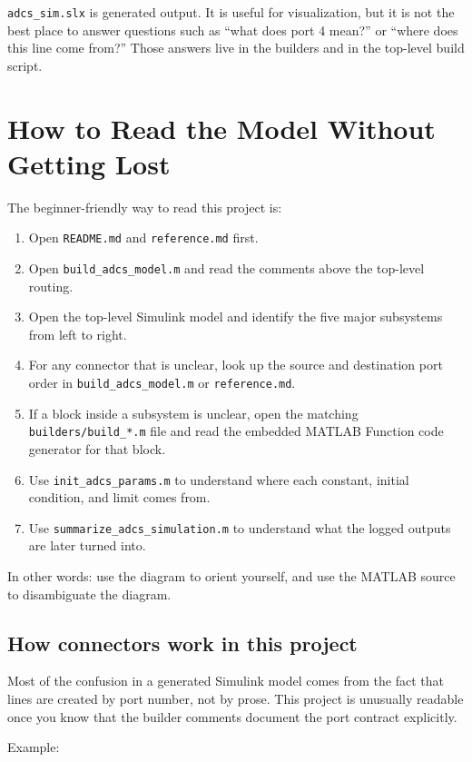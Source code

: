 \documentclass[11pt]{article}
\begin{document}
\texttt{adcs\_sim.slx} is generated output. It is useful for visualization, but it is not the best place to answer questions such as ``what does port 4 mean?'' or ``where does this line come from?'' Those answers live in the builders and in the top-level build script.

\section{How to Read the Model Without Getting Lost}

The beginner-friendly way to read this project is:

\begin{enumerate}
\item Open \texttt{README.md} and \texttt{reference.md} first.
\item Open \texttt{build\_adcs\_model.m} and read the comments above the top-level routing.
\item Open the top-level Simulink model and identify the five major subsystems from left to right.
\item For any connector that is unclear, look up the source and destination port order in \texttt{build\_adcs\_model.m} or \texttt{reference.md}.
\item If a block inside a subsystem is unclear, open the matching \texttt{builders/build\_*.m} file and read the embedded MATLAB Function code generator for that block.
\item Use \texttt{init\_adcs\_params.m} to understand where each constant, initial condition, and limit comes from.
\item Use \texttt{summarize\_adcs\_simulation.m} to understand what the logged outputs are later turned into.
\end{enumerate}

In other words: use the diagram to orient yourself, and use the MATLAB source to disambiguate the diagram.

\subsection{How connectors work in this project}

Most of the confusion in a generated Simulink model comes from the fact that lines are created by port number, not by prose. This project is unusually readable once you know that the builder comments document the port contract explicitly.

Example:
\end{document}
